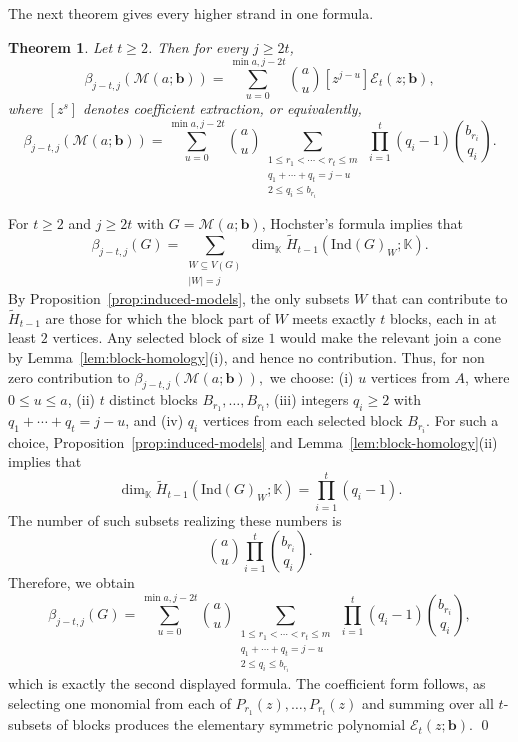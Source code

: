\documentclass[12pt]{article}
\renewenvironment{proof}{{\bf \noindent Proof.}}{\qed}
\newtheorem{theorem}{Theorem}[section]
\theoremstyle{definition}
\theoremstyle{remark}
\newcommand{\kk}{\mathbb{K}}
\newcommand{\EE}{\mathcal{E}}
\newcommand{\MM}{\mathcal{M}}
\newcommand{\ind}{\mathrm{Ind}}
\newcommand{\bk}[1]{\mathbf{#1}}
\newcommand{\wt}{\widetilde}
\begin{document}
	 \medskip The next theorem gives every higher strand in one formula.
	
	\begin{theorem}\label{thm:split-higher}
		Let $t\geq 2$. Then for every $j\geq 2t$,
		$$
		\beta_{j-t,j}(\MM(a;\bk{b}))
		= \sum_{u=0}^{\min{a,j-2t}}
		\binom{a}{u}[z^{j-u}]\EE_t(z;\bk{b}),
		$$
		where $[z^s]$ denotes coefficient extraction, or equivalently,
		$$
		\beta_{j-t,j}(\MM(a;\bk{b}))
		= \sum_{u=0}^{\min{a,j-2t}}
		\binom{a}{u}
		\sum_{\substack{1\leq r_1<\cdots<r_t\leq m\\
				q_1+\cdots+q_t=j-u\\
				2\leq q_i\leq b_{r_i}}}~
		\prod_{i=1}^t (q_i-1)\binom{b_{r_i}}{q_i}.
		$$
	\end{theorem}
	
	\begin{proof}
		For $t\geq 2$ and $j\geq 2t$ with $G=\MM(a;\bk{b})$, Hochster's formula implies that
		$$
		\beta_{j-t,j}(G)=\sum_{\substack{W\subseteq V(G)\\ |W|=j}}
		\dim_{\kk}\wt H_{t-1}(\ind(G)_W;\kk).
		$$
		By Proposition~\ref{prop:induced-models}, the only subsets $W$ that can contribute to $\wt H_{t-1}$ are those for which the block part of $W$ meets exactly $t$ blocks, each in at least $2$ vertices. Any selected block of size $1$ would make the relevant join a cone by Lemma~\ref{lem:block-homology}(i), and hence no contribution. Thus, for non zero contribution to $ \beta_{j-t,j}(\MM(a;\bk{b})),$ we choose: (i)  $u$ vertices from $A$, where $0\leq u\leq a$, (ii)   $t$ distinct blocks $B_{r_1},\dots,B_{r_t}$, (iii)   integers $q_i\geq 2$ with $q_1+\cdots+q_t=j-u$, and (iv)   $q_i$ vertices from each selected block $B_{r_i}$. 		
		For such a choice, Proposition~\ref{prop:induced-models} and Lemma~\ref{lem:block-homology}(ii) implies that
		$$
		\dim_{\kk}\wt H_{t-1}(\ind(G)_W;\kk)=\prod_{i=1}^t (q_i-1).
		$$
		The number of such subsets realizing these numbers is
		$$
		\binom{a}{u}\prod_{i=1}^t \binom{b_{r_i}}{q_i}.
		$$
		Therefore, we obtain 
		$$
		\beta_{j-t,j}(G)=
		\sum_{u=0}^{\min{a,j-2t}}
		\binom{a}{u}
		\sum_{\substack{1\leq r_1<\cdots<r_t\leq m\\
				q_1+\cdots+q_t=j-u\\
				2\leq q_i\leq b_{r_i}}}~
		\prod_{i=1}^t (q_i-1)\binom{b_{r_i}}{q_i},
		$$
		which is exactly the second displayed formula. The coefficient form follows, as selecting one monomial from each of $P_{r_1}(z),\dots,P_{r_t}(z)$ and summing over all $t$-subsets of blocks produces the elementary symmetric polynomial $\EE_t(z;\bk{b})$.
	\end{proof}
	
\end{document}
